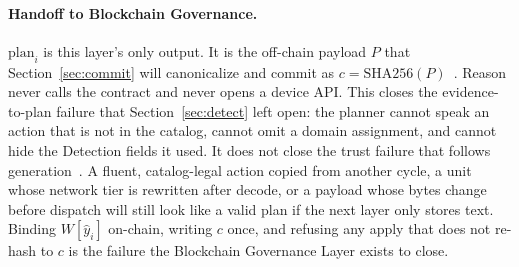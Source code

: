 \paragraph{Handoff to Blockchain Governance.}
$\mathrm{plan}_i$ is this layer's only output. It is the off-chain payload $P$ that Section~\ref{sec:commit} will canonicalize and commit as $c=\mathrm{SHA256}(P)$~\cite{zhang2024exploit,jan2025}. Reason never calls the contract and never opens a device API. This closes the evidence-to-plan failure that Section~\ref{sec:detect} left open: the planner cannot speak an action that is not in the catalog, cannot omit a domain assignment, and cannot hide the Detection fields it used. It does not close the trust failure that follows generation~\cite{chhabra2026,pendli2025}. A fluent, catalog-legal action copied from another cycle, a unit whose network tier is rewritten after decode, or a payload whose bytes change before dispatch will still look like a valid plan if the next layer only stores text. Binding $W[\hat{y}_i]$ on-chain, writing $c$ once, and refusing any apply that does not re-hash to $c$ is the failure the Blockchain Governance Layer exists to close.
